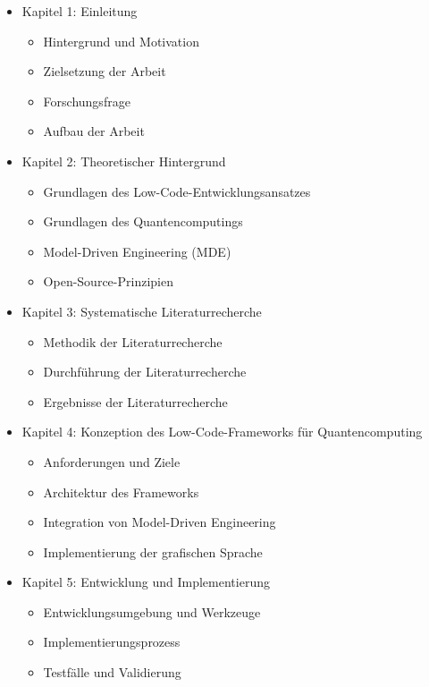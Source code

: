 \begin{itemize}
  \item Kapitel 1: Einleitung
      \begin{itemize}
          \item Hintergrund und Motivation
          \item Zielsetzung der Arbeit
          \item Forschungsfrage
          \item Aufbau der Arbeit
      \end{itemize}
  \item Kapitel 2: Theoretischer Hintergrund
      \begin{itemize}
          \item Grundlagen des Low-Code-Entwicklungsansatzes
          \item Grundlagen des Quantencomputings
          \item Model-Driven Engineering (MDE)
          \item Open-Source-Prinzipien
      \end{itemize}
  \item Kapitel 3: Systematische Literaturrecherche
      \begin{itemize}
          \item Methodik der Literaturrecherche
          \item Durchführung der Literaturrecherche
          \item Ergebnisse der Literaturrecherche
      \end{itemize}
  \item Kapitel 4: Konzeption des Low-Code-Frameworks für Quantencomputing
      \begin{itemize}
          \item Anforderungen und Ziele
          \item Architektur des Frameworks
          \item Integration von Model-Driven Engineering
          \item Implementierung der grafischen Sprache
      \end{itemize}
  \item Kapitel 5: Entwicklung und Implementierung
      \begin{itemize}
          \item Entwicklungsumgebung und Werkzeuge
          \item Implementierungsprozess
          \item Testfälle und Validierung

\end{itemize}
\end{itemize}
